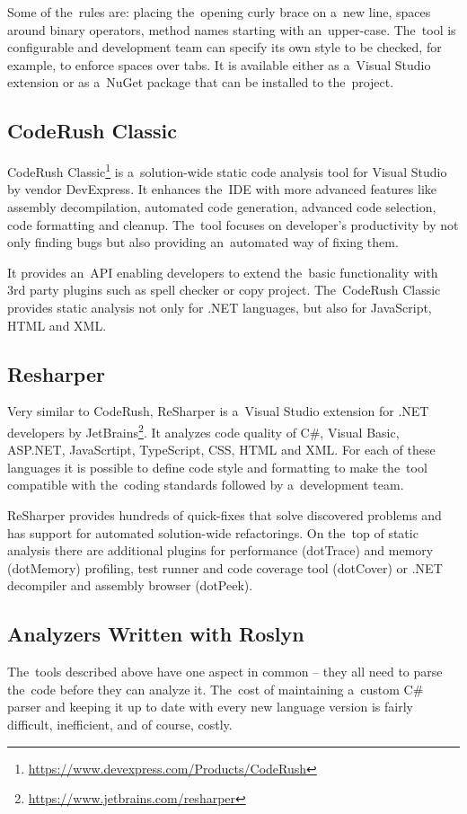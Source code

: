 \documentclass[
  digital, %
  table,   %
  lof,     %
  lot,     %
  oneside,
]{fithesis3}
\begin{document}
Some of the~rules are: placing the~opening curly brace on a~new line, spaces around binary operators, method names starting with an~upper-case. The~tool is configurable and development team can specify its own style to be checked, for example, to enforce spaces over tabs. It is available either as a~Visual Studio extension or as a~NuGet package that can be installed to the~project.

\subsection{CodeRush Classic}
CodeRush Classic\footnote{\url{https://www.devexpress.com/Products/CodeRush}} is a~solution-wide static code analysis tool for Visual Studio by vendor DevExpress. It enhances the~IDE with more advanced features like assembly decompilation, automated code generation, advanced code selection, code formatting and cleanup. The~tool focuses on developer's productivity by not only finding bugs but also providing an~automated way of fixing them.

It provides an~API enabling developers to extend the~basic functionality with 3rd party plugins such as spell checker or copy project. The~CodeRush Classic provides static analysis not only for .NET languages, but also for JavaScript, HTML and XML.

\subsection{Resharper}
Very similar to CodeRush, ReSharper is a~Visual Studio extension for .NET developers by JetBrains\footnote{\url{https://www.jetbrains.com/resharper}}. It analyzes code quality of C\#, Visual Basic, ASP.NET, JavaScrtipt, TypeScript, CSS, HTML and XML. For each of these languages it is possible to define code style and formatting to make the~tool compatible with the~coding standards followed by a~development team. 

ReSharper provides hundreds of quick-fixes that solve discovered problems and has support for automated solution-wide refactorings. On the~top of static analysis there are additional plugins for performance (dotTrace) and memory (dotMemory) profiling, test runner and code coverage tool (dotCover) or .NET decompiler and assembly browser (dotPeek).


\subsection{Analyzers Written with Roslyn}
The~tools described above have one aspect in common -- they all need to parse the~code before they can analyze it. The~cost of maintaining a~custom C\# parser and keeping it up to date with every new language version is fairly difficult, inefficient, and of course, costly. 
\end{document}
